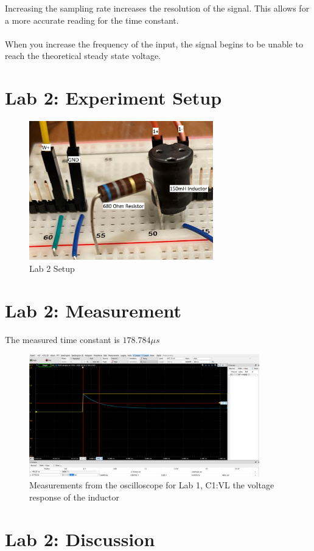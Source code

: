 \documentclass[12pt]{article}
\begin{document}
Increasing the sampling rate increases the resolution of the signal. This
allows for a more accurate reading for the time constant.
\\\\
When you increase the frequency of the input, the signal begins to be unable to reach the theoretical steady state voltage.

\pagebreak
\section*{Lab 2: Experiment Setup}
\begin{figure}[h]
\includegraphics[width=8cm]{Lab2}
\centering
\caption{Lab 2 Setup}
\end{figure}
\section*{Lab 2: Measurement}
The measured time constant is $178.784\mu s$
\begin{figure}[h]
\includegraphics[width=10cm]{Problem 2fig}
\centering
\caption{Measurements from the oscilloscope for Lab 1, C1:VL the voltage response of the inductor}
\end{figure}
\section*{Lab 2: Discussion}
\end{document}
